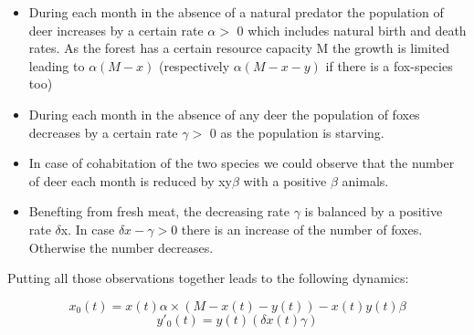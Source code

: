 \documentclass[a4paper,12pt]{article}
\begin{document}
\begin{itemize}
\item{During each month in the absence of a natural predator the population of deer increases by a
certain rate $\alpha >$ 0 which includes natural birth and death rates. As the forest has a certain
resource capacity M the growth is limited leading to $\alpha(M-x)$ (respectively $\alpha(M-x-y)$ if there
is a fox-species too)}
\item{During each month in the absence of any deer the population of foxes decreases by a certain rate
 $\gamma >$ 0 as the population is starving.}
\item{In case of cohabitation of the two species we could observe that the number of deer each month is
reduced by xy$\beta$ with a positive $\beta$ animals.}
\item{Benefting from fresh meat, the decreasing rate $\gamma$
 is balanced by a positive rate $\delta$x. In case $\delta x-\gamma
 > 0$
there is an increase of the number of foxes. Otherwise the number decreases.}\\
\end{itemize}
Putting all those observations together leads to the following dynamics:

\begin{center}
\begin{equation}
x_0(t) = x(t)\alpha \times(M - x(t) - y(t)) - x(t)y(t)\beta 
\label{eq:1}
\end{equation}
\begin{equation}
y'_0(t) = y(t)(\delta x(t) \gamma)
\label{eq:2}
\end{equation}
\end{center}
\end{document}
